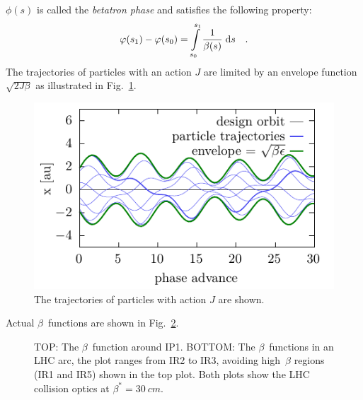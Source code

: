 $\phi(s)$ is called the \emph{betatron phase} and satisfies the following property:
%
\begin{equation}
    \varphi(s_1) - \varphi(s_0) = \int\limits_{s_0}^{s_1} \frac{1}{\beta(s)}\;\text{d} s
    \quad .
    \label{eq_phase}
\end{equation}
%
The trajectories of particles with an action $J$ are limited by an envelope function $\sqrt{2J\beta}$ as illustrated in Fig.~\ref{fig_part_traj}.
%
\begin{figure}[ht]
    \centering
    \includegraphics[width=.7\linewidth]{particle_traj_beta_many_wb}
    \caption{The trajectories of particles with action $J$ are shown.}
    \label{fig_part_traj}
\end{figure}
%
Actual $\beta$~functions are shown in Fig.~\ref{fig_beta}.
%
\begin{figure}[ht]
  \centering
  \footnotesize
  
  
  \normalsize
  \caption{
    TOP: The $\beta$~function around IP1.
    BOTTOM: The $\beta$~functions in an LHC arc, the plot ranges from IR2 to IR3,
    avoiding high~$\beta$ regions (IR1 and IR5) shown in the top plot.
    Both plots show the LHC collision optics at $\beta^*=\SI{30}{cm}$.
  }
  \label{fig_beta}
\end{figure}

